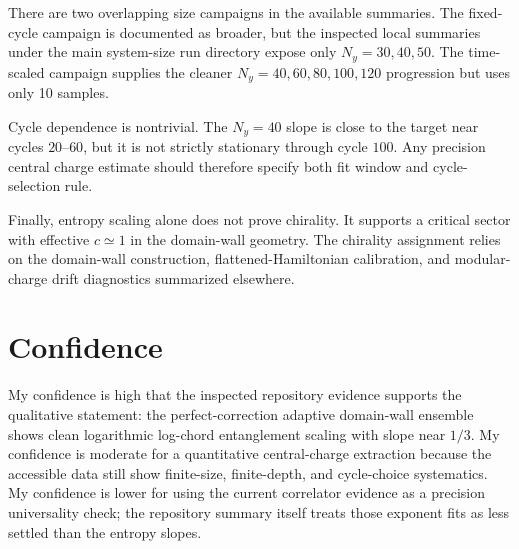 \documentclass[aps,prb,onecolumn,nofootinbib,superscriptaddress]{revtex4-2}
\newcommand{\Ny}{N_y}
\begin{document}
There are two overlapping size campaigns in the available summaries.  The fixed-cycle
campaign is documented as broader, but the inspected local summaries under the main
system-size run directory expose only $\Ny=30,40,50$.  The time-scaled campaign supplies
the cleaner $\Ny=40,60,80,100,120$ progression but uses only 10 samples.

Cycle dependence is nontrivial.  The $\Ny=40$ slope is close to the target near cycles
$20$--$60$, but it is not strictly stationary through cycle $100$.  Any precision central
charge estimate should therefore specify both fit window and cycle-selection rule.

Finally, entropy scaling alone does not prove chirality.  It supports a critical sector
with effective $c\simeq1$ in the domain-wall geometry.  The chirality assignment relies on
the domain-wall construction, flattened-Hamiltonian calibration, and modular-charge drift
diagnostics summarized elsewhere.

\section{Confidence}

My confidence is high that the inspected repository evidence supports the qualitative
statement: the perfect-correction adaptive domain-wall ensemble shows clean logarithmic
log-chord entanglement scaling with slope near $1/3$.  My confidence is moderate for a
quantitative central-charge extraction because the accessible data still show finite-size,
finite-depth, and cycle-choice systematics.  My confidence is lower for using the current
correlator evidence as a precision universality check; the repository summary itself
treats those exponent fits as less settled than the entropy slopes.
\end{document}
